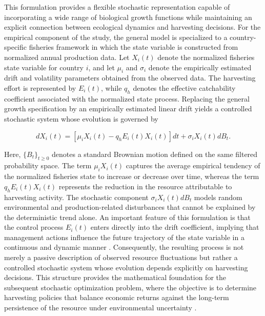 \documentclass[11pt]{article}
\begin{document}
	This formulation provides a flexible stochastic representation capable of incorporating a wide range of biological growth functions while maintaining an explicit connection between ecological dynamics and harvesting decisions. For the empirical component of the study, the general model is specialized to a country-specific fisheries framework in which the state variable is constructed from normalized annual production data. Let $X_i(t)$ denote the normalized fisheries state variable for country $i$, and let $\mu_i$ and $\sigma_i$ denote the empirically estimated drift and volatility parameters obtained from the observed data. The harvesting effort is represented by $E_i(t)$, while $q_h$ denotes the effective catchability coefficient associated with the normalized state process. Replacing the general growth specification by an empirically estimated linear drift yields a controlled stochastic system whose evolution is governed by
	
	\begin{equation}
		dX_i(t)=
		\left[
		\mu_iX_i(t)-q_hE_i(t)X_i(t)
		\right]dt
		+
		\sigma_iX_i(t)dB_t.
		\label{eq:controlled_sde}
	\end{equation}
	
	Here, $\{B_t\}_{t\geq0}$ denotes a standard Brownian motion defined on the same filtered probability space. The term $\mu_iX_i(t)$ captures the average empirical tendency of the normalized fisheries state to increase or decrease over time, whereas the term $q_hE_i(t)X_i(t)$ represents the reduction in the resource attributable to harvesting activity. The stochastic component $\sigma_iX_i(t)dB_t$ models random environmental and production-related disturbances that cannot be explained by the deterministic trend alone. An important feature of this formulation is that the control process $E_i(t)$ enters directly into the drift coefficient, implying that management actions influence the future trajectory of the state variable in a continuous and dynamic manner \citep{pramanik2026bayesian}. Consequently, the resulting process is not merely a passive description of observed resource fluctuations but rather a controlled stochastic system whose evolution depends explicitly on harvesting decisions. This structure provides the mathematical foundation for the subsequent stochastic optimization problem, where the objective is to determine harvesting policies that balance economic returns against the long-term persistence of the resource under environmental uncertainty \citep{powell2026role}.
	
\end{document}
